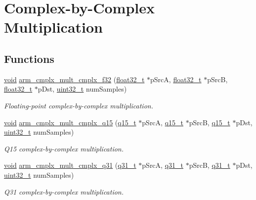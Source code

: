 \hypertarget{group___cmplx_by_cmplx_mult}{\section{Complex-\/by-\/\-Complex Multiplication}
\label{group___cmplx_by_cmplx_mult}
}
\subsection*{Functions}
\begin{DoxyCompactItemize}
\item 
\hyperlink{group___n_a_m_e_ga18028b8badbf1ea7e704ccac3c488e82}{void} \hyperlink{group___cmplx_by_cmplx_mult_ga14b47080054a1ba1250a86805be1ff6b}{arm\-\_\-cmplx\-\_\-mult\-\_\-cmplx\-\_\-f32} (\hyperlink{arm__math_8h_a4611b605e45ab401f02cab15c5e38715}{float32\-\_\-t} $\ast$p\-Src\-A, \hyperlink{arm__math_8h_a4611b605e45ab401f02cab15c5e38715}{float32\-\_\-t} $\ast$p\-Src\-B, \hyperlink{arm__math_8h_a4611b605e45ab401f02cab15c5e38715}{float32\-\_\-t} $\ast$p\-Dst, \hyperlink{stdint_8h_a435d1572bf3f880d55459d9805097f62}{uint32\-\_\-t} num\-Samples)
\begin{DoxyCompactList}\small\item\em Floating-\/point complex-\/by-\/complex multiplication. \end{DoxyCompactList}\item 
\hyperlink{group___n_a_m_e_ga18028b8badbf1ea7e704ccac3c488e82}{void} \hyperlink{group___cmplx_by_cmplx_mult_ga67e96abfc9c3e30efb70a2ec9d0fe7e8}{arm\-\_\-cmplx\-\_\-mult\-\_\-cmplx\-\_\-q15} (\hyperlink{arm__math_8h_ab5a8fb21a5b3b983d5f54f31614052ea}{q15\-\_\-t} $\ast$p\-Src\-A, \hyperlink{arm__math_8h_ab5a8fb21a5b3b983d5f54f31614052ea}{q15\-\_\-t} $\ast$p\-Src\-B, \hyperlink{arm__math_8h_ab5a8fb21a5b3b983d5f54f31614052ea}{q15\-\_\-t} $\ast$p\-Dst, \hyperlink{stdint_8h_a435d1572bf3f880d55459d9805097f62}{uint32\-\_\-t} num\-Samples)
\begin{DoxyCompactList}\small\item\em Q15 complex-\/by-\/complex multiplication. \end{DoxyCompactList}\item 
\hyperlink{group___n_a_m_e_ga18028b8badbf1ea7e704ccac3c488e82}{void} \hyperlink{group___cmplx_by_cmplx_mult_ga1829e50993a90742de225a0ce4213838}{arm\-\_\-cmplx\-\_\-mult\-\_\-cmplx\-\_\-q31} (\hyperlink{arm__math_8h_adc89a3547f5324b7b3b95adec3806bc0}{q31\-\_\-t} $\ast$p\-Src\-A, \hyperlink{arm__math_8h_adc89a3547f5324b7b3b95adec3806bc0}{q31\-\_\-t} $\ast$p\-Src\-B, \hyperlink{arm__math_8h_adc89a3547f5324b7b3b95adec3806bc0}{q31\-\_\-t} $\ast$p\-Dst, \hyperlink{stdint_8h_a435d1572bf3f880d55459d9805097f62}{uint32\-\_\-t} num\-Samples)
\begin{DoxyCompactList}\small\item\em Q31 complex-\/by-\/complex multiplication. \end{DoxyCompactList}\end{DoxyCompactItemize}


